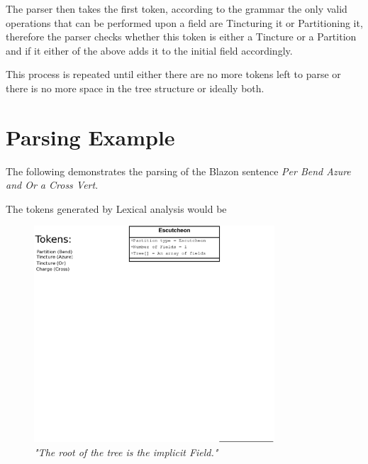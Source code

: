 The parser then takes the first token, according to the grammar the only valid operations that can be performed upon a field are Tincturing it or Partitioning it, therefore the parser checks whether this token is either a Tincture or a Partition and if it either of the above adds it to the initial field accordingly.  

This process is repeated until either there are no more tokens left to parse or there is no more space in the tree structure or ideally both. 



\section{Parsing Example}

 
The following demonstrates the parsing of the Blazon sentence \emph{Per Bend Azure and Or a Cross Vert}.  

The tokens generated by Lexical analysis would be 


\begin{figure}[H]
  \centering
    \includegraphics[width=0.8\textwidth]{parsing/images/Parsing5.eps}
  \caption{\emph{"The root of the tree is the implicit Field."}}
  
\end{figure}


